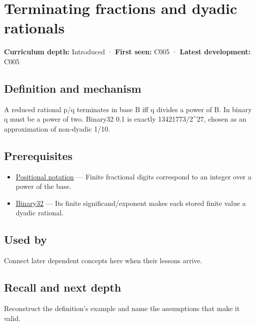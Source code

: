 \hypertarget{appendix-2a2f1b74bdd3}{}
\section{Terminating fractions and dyadic rationals}\label{appendix-2a2f1b74bdd3-terminating-fractions-and-dyadic-rationals}

\textbf{Curriculum depth:} Introduced · \textbf{First seen:} C005 · \textbf{Latest development:} C005

\subsection{Definition and mechanism}\label{appendix-2a2f1b74bdd3-definition-and-mechanism}

A reduced rational p/q terminates in base B iff q divides a power of B. In binary q must be a power of two. Binary32 0.1 is exactly 13421773/2\^{}27, chosen as an approximation of non-dyadic 1/10.

\subsection{Prerequisites}\label{appendix-2a2f1b74bdd3-prerequisites}

\begin{itemize}
\tightlist
\item
  \hyperref[appendix-83c3f28f7bda]{Positional notation} --- Finite fractional digits correspond to an integer over a power of the base.
\item
  \hyperref[appendix-5057f9ad327f]{Binary32} --- Its finite significand/exponent makes each stored finite value a dyadic rational.
\end{itemize}

\subsection{Used by}\label{appendix-2a2f1b74bdd3-used-by}

Connect later dependent concepts here when their lessons arrive.

\subsection{Recall and next depth}\label{appendix-2a2f1b74bdd3-recall-and-next-depth}

Reconstruct the definition's example and name the assumptions that make it valid.

